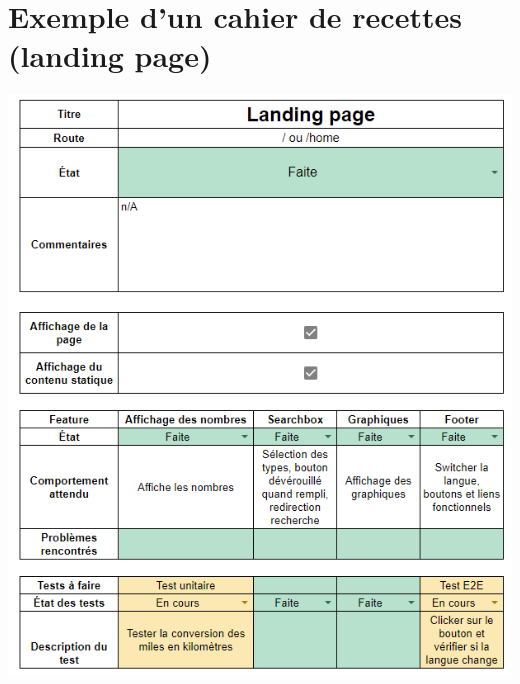 \section{Exemple d'un cahier de recettes (landing page)}
\label{Exemple d'un cahier de recettes (landing page)}
\begin{center}
\includegraphics[width=\linewidth]{medias/cahierRecette.png}
\end{center}

